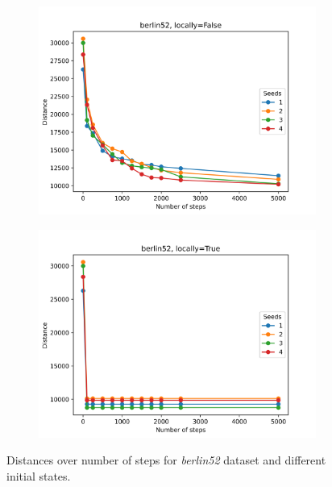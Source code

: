 \begin{figure}[!htb]
	\centering
	\begin{subfigure}{0.45\textwidth}
		\includegraphics[width=\textwidth]{img/berlin52_seeds_locally=False}
	\end{subfigure}
	\begin{subfigure}{0.45\textwidth}
		\includegraphics[width=\textwidth]{img/berlin52_seeds_locally=True}
	\end{subfigure}
	\caption{Distances over number of steps for \textit{berlin52} dataset and different initial states.}
	\label{fig:berlin52_seeds}
\end{figure}
	
